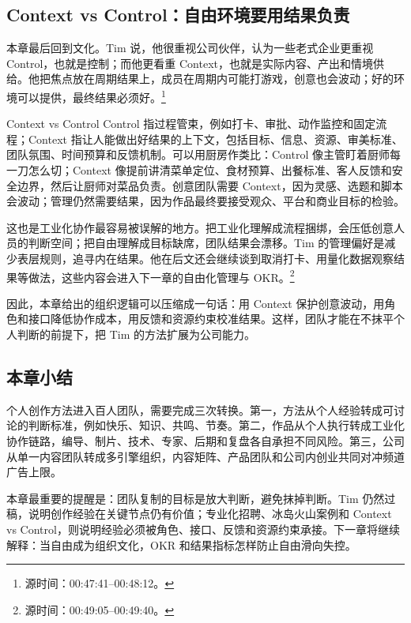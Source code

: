 \subsection{Context vs Control：自由环境要用结果负责}

本章最后回到文化。Tim 说，他很重视公司伙伴，认为一些老式企业更重视 Control，也就是控制；而他更看重 Context，也就是实际内容、产出和情境供给。他把焦点放在周期结果上，成员在周期内可能打游戏，创意也会波动；好的环境可以提供，最终结果必须好。\footnote{源时间：00:47:41--00:48:12。}

\begin{knowledgebox}{Context vs Control}
Control 指过程管束，例如打卡、审批、动作监控和固定流程；Context 指让人能做出好结果的上下文，包括目标、信息、资源、审美标准、团队氛围、时间预算和反馈机制。可以用厨房作类比：Control 像主管盯着厨师每一刀怎么切；Context 像提前讲清菜单定位、食材预算、出餐标准、客人反馈和安全边界，然后让厨师对菜品负责。创意团队需要 Context，因为灵感、选题和脚本会波动；管理仍然需要结果，因为作品最终要接受观众、平台和商业目标的检验。
\end{knowledgebox}

这也是工业化协作最容易被误解的地方。把工业化理解成流程捆绑，会压低创意人员的判断空间；把自由理解成目标缺席，团队结果会漂移。Tim 的管理偏好是减少表层规则，追寻内在结果。他在后文还会继续谈到取消打卡、用量化数据观察结果等做法，这些内容会进入下一章的自由化管理与 OKR。\footnote{源时间：00:49:05--00:49:40。}

因此，本章给出的组织逻辑可以压缩成一句话：用 Context 保护创意波动，用角色和接口降低协作成本，用反馈和资源约束校准结果。这样，团队才能在不抹平个人判断的前提下，把 Tim 的方法扩展为公司能力。

\subsection{本章小结}

个人创作方法进入百人团队，需要完成三次转换。第一，方法从个人经验转成可讨论的判断标准，例如快乐、知识、共鸣、节奏。第二，作品从个人执行转成工业化协作链路，编导、制片、技术、专家、后期和复盘各自承担不同风险。第三，公司从单一内容团队转成多引擎组织，内容矩阵、产品团队和公司内创业共同对冲频道广告上限。

本章最重要的提醒是：团队复制的目标是放大判断，避免抹掉判断。Tim 仍然过稿，说明创作经验在关键节点仍有价值；专业化招聘、冰岛火山案例和 Context vs Control，则说明经验必须被角色、接口、反馈和资源约束承接。下一章将继续解释：当自由成为组织文化，OKR 和结果指标怎样防止自由滑向失控。
